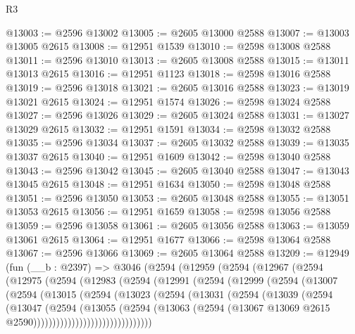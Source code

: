 \begin{lexlean}{R3}
\begin{coremodule}
@13003 := @2596 @13002
@13005 := @2605 @13000 @2588
@13007 := @13003 @13005 @2615
@13008 := @12951 @1539
@13010 := @2598 @13008 @2588
@13011 := @2596 @13010
@13013 := @2605 @13008 @2588
@13015 := @13011 @13013 @2615
@13016 := @12951 @1123
@13018 := @2598 @13016 @2588
@13019 := @2596 @13018
@13021 := @2605 @13016 @2588
@13023 := @13019 @13021 @2615
@13024 := @12951 @1574
@13026 := @2598 @13024 @2588
@13027 := @2596 @13026
@13029 := @2605 @13024 @2588
@13031 := @13027 @13029 @2615
@13032 := @12951 @1591
@13034 := @2598 @13032 @2588
@13035 := @2596 @13034
@13037 := @2605 @13032 @2588
@13039 := @13035 @13037 @2615
@13040 := @12951 @1609
@13042 := @2598 @13040 @2588
@13043 := @2596 @13042
@13045 := @2605 @13040 @2588
@13047 := @13043 @13045 @2615
@13048 := @12951 @1634
@13050 := @2598 @13048 @2588
@13051 := @2596 @13050
@13053 := @2605 @13048 @2588
@13055 := @13051 @13053 @2615
@13056 := @12951 @1659
@13058 := @2598 @13056 @2588
@13059 := @2596 @13058
@13061 := @2605 @13056 @2588
@13063 := @13059 @13061 @2615
@13064 := @12951 @1677
@13066 := @2598 @13064 @2588
@13067 := @2596 @13066
@13069 := @2605 @13064 @2588
@13209 := @12949
    (fun (__b : @2397) =>
    @3046
      (@2594
        (@12959
          (@2594
            (@12967
              (@2594
                (@12975
                  (@2594
                    (@12983
                      (@2594
                        (@12991
                          (@2594
                            (@12999
                              (@2594
                                (@13007
                                  (@2594
                                    (@13015
                                      (@2594
                                        (@13023
                                          (@2594
                                            (@13031
                                              (@2594
                                                (@13039
                                                  (@2594
                                                    (@13047
                                                      (@2594
                                                        (@13055
                                                          (@2594
                                                            (@13063
                                                              (@2594
                                                                (@13067
                                                                  @13069
                                                                  @2615
                                                                  @2590)))))))))))))))))))))))))))))))

\end{coremodule}
\end{lexlean}
